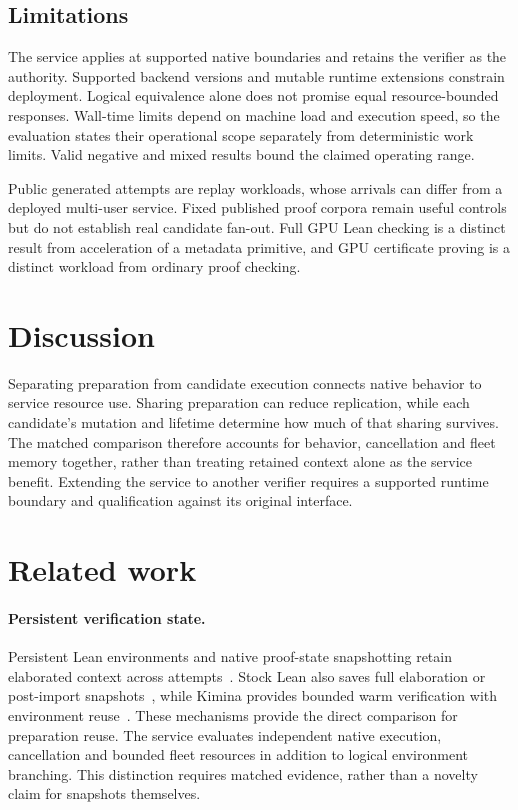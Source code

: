 \documentclass[10pt,twocolumn]{article}
\begin{document}
\subsection{Limitations}
The service applies at supported native boundaries and retains the verifier as the authority. Supported backend versions and mutable runtime extensions constrain deployment. Logical equivalence alone does not promise equal resource-bounded responses. Wall-time limits depend on machine load and execution speed, so the evaluation states their operational scope separately from deterministic work limits. Valid negative and mixed results bound the claimed operating range.

Public generated attempts are replay workloads, whose arrivals can differ from a deployed multi-user service. Fixed published proof corpora remain useful controls but do not establish real candidate fan-out. Full GPU Lean checking is a distinct result from acceleration of a metadata primitive, and GPU certificate proving is a distinct workload from ordinary proof checking.

\section{Discussion}
Separating preparation from candidate execution connects native behavior to service resource use. Sharing preparation can reduce replication, while each candidate's mutation and lifetime determine how much of that sharing survives. The matched comparison therefore accounts for behavior, cancellation and fleet memory together, rather than treating retained context alone as the service benefit. Extending the service to another verifier requires a supported runtime boundary and qualification against its original interface.

\section{Related work}
\paragraph{Persistent verification state.}
Persistent Lean environments and native proof-state snapshotting retain elaborated context across attempts~\cite{repl,leanSnapshot}. Stock Lean also saves full elaboration or post-import snapshots~\cite{leanIncremental}, while Kimina provides bounded warm verification with environment reuse~\cite{kimina,kiminaPaper}. These mechanisms provide the direct comparison for preparation reuse. The service evaluates independent native execution, cancellation and bounded fleet resources in addition to logical environment branching. This distinction requires matched evidence, rather than a novelty claim for snapshots themselves.
\end{document}
